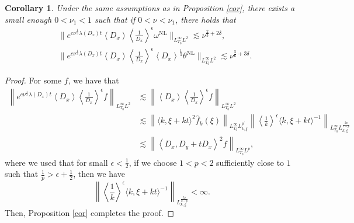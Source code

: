 \documentclass[reqno, 12pt]{amsart} %
\theoremstyle{plain} %
\newtheorem{Cor}[Thm]{Corollary}
\theoremstyle{definition}
\theoremstyle{remark}
\numberwithin{equation}{section} %
\begin{document}
	
	
	\begin{Cor} \label{cor2}
		Under the same assumptions as in Proposition \ref{cor}, there exists a small enough $0< \nu_1<1$ such that if $0<\nu<\nu_1$, there holds that
		\begin{equation*}\begin{aligned} 
				&\|e^{c \nu^{\frac{1}{3}} \lambda\left(D_x\right) t}\left\langle D_x\right\rangle\left\langle\frac{1}{D_x}\right\rangle^\epsilon \omega^{\mathrm{NL}}\|_{L_{T_0}^\infty L^2}  \lesssim \nu^{\frac23 + 2\delta}, \\
				&\|e^{c \nu^{\frac{1}{3}} \lambda\left(D_x\right) t}\left\langle D_x\right\rangle\left\langle\frac{1}{D_x}\right\rangle^\epsilon \left\langle D_x\right\rangle^\frac13 \theta^{\mathrm{NL}}\|_{L_{T_0}^\infty L^2}    \lesssim \nu^{\frac56 + 3\delta}.
		\end{aligned}\end{equation*}
	\end{Cor}
	\begin{proof}
		For some $f$, we have that
		\begin{equation*}
			\begin{aligned}
				\left\|e^{c \nu^{\frac{1}{3}} \lambda\left(D_x\right) t}\left\langle D_x\right\rangle\left\langle\frac{1}{D_x}\right\rangle^\epsilon f\right\|_{L_{T_0}^\infty L^2} &\lesssim\left\|\left\langle D_x\right\rangle\left\langle\frac{1}{D_x}\right\rangle^\epsilon f\right\|_{L_{T_0}^\infty L^2} \\
				& \lesssim \left\|\langle k, \xi+k t\rangle^2 \hat{f}_k(\xi)\right\|_{L_{T_0}^\infty L_{k, \xi}^{p^{\prime}}} \left\|\left\langle\frac{1}{k}\right\rangle^\epsilon\langle k, \xi+k t\rangle^{-1}\right\|_{L_{T_0}^\infty L_{k, \xi}^{\frac{2 p}{2-p}}} \\
				& \lesssim\left\|\left\langle D_x, D_y+t D_x\right\rangle^2 f\right\|_{L_{T_0}^\infty L^p},
			\end{aligned}
		\end{equation*}
		where we used that for small $\epsilon<\frac{1}{2}$, if we choose $1<p<2$ sufficiently close to $1$ such that $\frac{1}{p}>\epsilon+\frac{1}{2}$, then we have
		\begin{equation*}
			\left\|\left\langle\frac{1}{k}\right\rangle^\epsilon\langle k, \xi+k t\rangle^{-1}\right\|_{ L_{k, \xi}^{\frac{2 p}{2-p}}} < \infty.
		\end{equation*}
		Then, Proposition \ref{cor} completes the proof.
	\end{proof}
	
\end{document}
